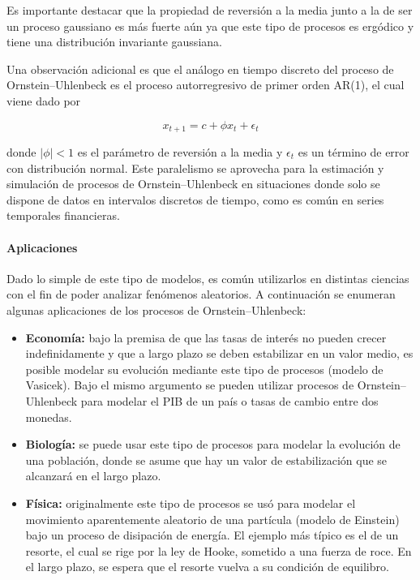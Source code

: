Es importante destacar que la propiedad de reversión a la media junto a la de ser un proceso gaussiano es más fuerte aún ya que este tipo de procesos es ergódico y tiene una distribución invariante gaussiana.

Una observación adicional es que el análogo en tiempo discreto del proceso de Ornstein–Uhlenbeck es el proceso autorregresivo de primer orden AR(1), el cual viene dado por

\begin{equation*}
    x_{t+1} = c + \phi x_t + \epsilon_t
\end{equation*}

donde $|\phi|<1$ es el parámetro de reversión a la media y $\epsilon_t$ es un término de error con distribución normal. Este paralelismo se aprovecha para la estimación y simulación de procesos de Ornstein–Uhlenbeck en situaciones donde solo se dispone de datos en intervalos discretos de tiempo, como es común en series temporales financieras.

\paragraph{Aplicaciones}

Dado lo simple de este tipo de modelos, es común utilizarlos en distintas ciencias con el fin de poder analizar fenómenos aleatorios. A continuación se enumeran algunas aplicaciones de los procesos de Ornstein–Uhlenbeck:

\begin{itemize}
    \item \textbf{Economía:} bajo la premisa de que las tasas de interés no pueden crecer indefinidamente y que a largo plazo se deben estabilizar en un valor medio, es posible modelar su evolución mediante este tipo de procesos (modelo de Vasicek). Bajo el mismo argumento se pueden utilizar procesos de Ornstein–Uhlenbeck para modelar el PIB de un país o tasas de cambio entre dos monedas.
    \item \textbf{Biología:} se puede usar este tipo de procesos para modelar la evolución de una población, donde se asume que hay un valor de estabilización que se alcanzará en el largo plazo.
    \item \textbf{Física:} originalmente este tipo de procesos se usó para modelar el movimiento aparentemente aleatorio de una partícula (modelo de Einstein) bajo un proceso de disipación de energía. El ejemplo más típico es el de un resorte, el cual se rige por la ley de Hooke, sometido a una fuerza de roce. En el largo plazo, se espera que el resorte vuelva a su condición de equilibro.
\end{itemize}


